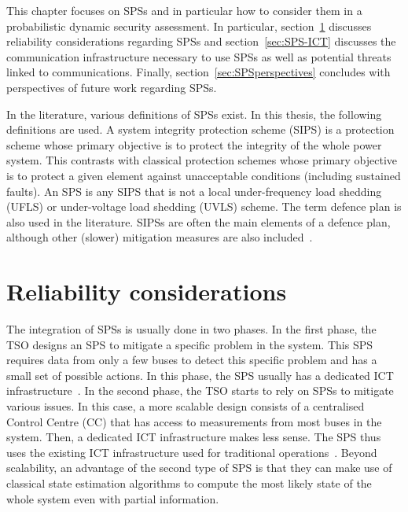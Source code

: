 This chapter focuses on SPSs and in particular how to consider them in a probabilistic dynamic security assessment. In particular, section~\ref{sec:SPSreliability} discusses reliability considerations regarding SPSs and section~\ref{sec:SPS-ICT} discusses the communication infrastructure necessary to use SPSs as well as potential threats linked to communications. Finally, section~\ref{sec:SPSperspectives} concludes with perspectives of future work regarding SPSs.

In the literature, various definitions of SPSs exist. In this thesis, the following definitions are used. A system integrity protection scheme (SIPS) is a protection scheme whose primary objective is to protect the integrity of the whole power system. This contrasts with classical protection schemes whose primary objective is to protect a given element against unacceptable conditions (including sustained faults). An SPS is any SIPS that is not a local under-frequency load shedding (UFLS) or under-voltage load shedding (UVLS) scheme. The term defence plan is also used in the literature. SIPSs are often the main elements of a defence plan, although other (slower) mitigation measures are also included~\cite{CigreDefensePlan, ENTSOEdefencePlan}.

\section{Reliability considerations}
\label{sec:SPSreliability}

The integration of SPSs is usually done in two phases. In the first phase, the TSO designs an SPS to mitigate a specific problem in the system. This SPS requires data from only a few buses to detect this specific problem and has a small set of possible actions. In this phase, the SPS usually has a dedicated ICT infrastructure~\cite{BelgiumSPS}. In the second phase, the TSO starts to rely on SPSs to mitigate various issues. In this case, a more scalable design consists of a centralised Control Centre (CC) that has access to measurements from most buses in the system. Then, a dedicated ICT infrastructure makes less sense. The SPS thus uses the existing ICT infrastructure used for traditional operations~\cite{GeorgiaSPS, UruguaySPS}. Beyond scalability, an advantage of the second type of SPS is that they can make use of classical state estimation algorithms to compute the most likely state of the whole system even with partial information.

